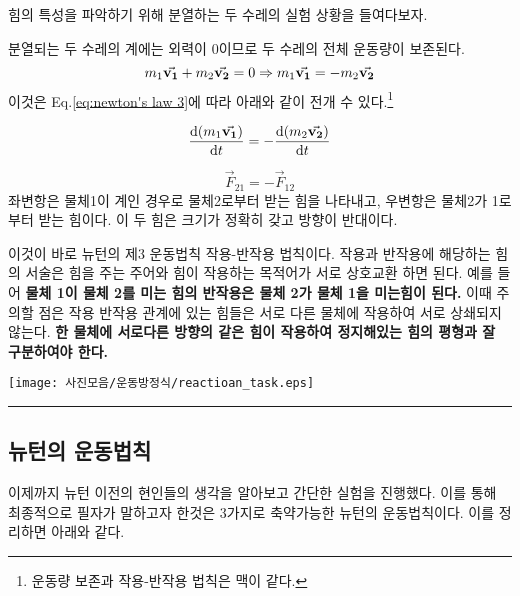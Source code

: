 \begin{flushleft}
힘의 특성을 파악하기 위해 분열하는 두 수레의 실험 상황을 들여다보자.

분열되는 두 수레의 계에는 외력이 0이므로 두 수레의 전체 운동량이 보존된다. 
\begin{equation}
  m_1 \va{v_1} +m_2 \va{v_2} =0      \Rightarrow   m_1 \va{v_1} =-m_2 \va{v_2}
\end{equation}
이것은 Eq.\ref{eq:newton's law 3}에 따라 아래와 같이 전개 수 있다.\footnote{운동량 보존과 작용-반작용 법칙은 맥이 같다.}

\begin{equation}
  \dv{(m_1 \va{v_1})}{t} =-\dv{(m_2 \va{v_2})}{t} 
\end{equation}

\begin{equation}
  \vec{F}_{21}=-\vec{F}_{12}
\end{equation}
좌변항은 물체1이 계인 경우로 물체2로부터 받는 힘을 나타내고, 우변항은 물체2가 1로부터 받는 힘이다. 
이 두 힘은 크기가 정확히 갖고 방향이 반대이다.

이것이 바로 뉴턴의 제3 운동법칙 작용-반작용 법칙이다. 작용과 반작용에 해당하는 힘의 서술은 힘을 주는 주어와 힘이 작용하는 
목적어가 서로 상호교환 하면 된다. 예를 들어 \textbf{물체 1이 물체 2를 미는 힘의 반작용은 물체 2가 물체 1을 미는힘이 된다.}
이때 주의할 점은 작용 반작용 관계에 있는 힘들은 서로 다른 물체에 작용하여 서로 상쇄되지 않는다. 
\textbf{한 물체에 서로다른 방향의 같은 힘이 작용하여 정지해있는 힘의 평형과 잘 구분하여야 한다.}
\newpage
\begin{task}
  \begin{flushleft}
    {
    {\texttt{[image: 사진모음/운동방정식/reactioan\_task.eps]}
  \label{fig:물체옆의물체}}%
    {\rule{\linewidth}{4cm}}}
   \end{flushleft}
\end{task}



\subsection{뉴턴의 운동법칙}
이제까지 뉴턴 이전의 현인들의 생각을 알아보고 간단한 실험을 진행했다. 이를 통해 최종적으로 필자가 말하고자 한것은 
3가지로 축약가능한 뉴턴의 운동법칙이다. 이를 정리하면 아래와 같다. 



\end{flushleft}
